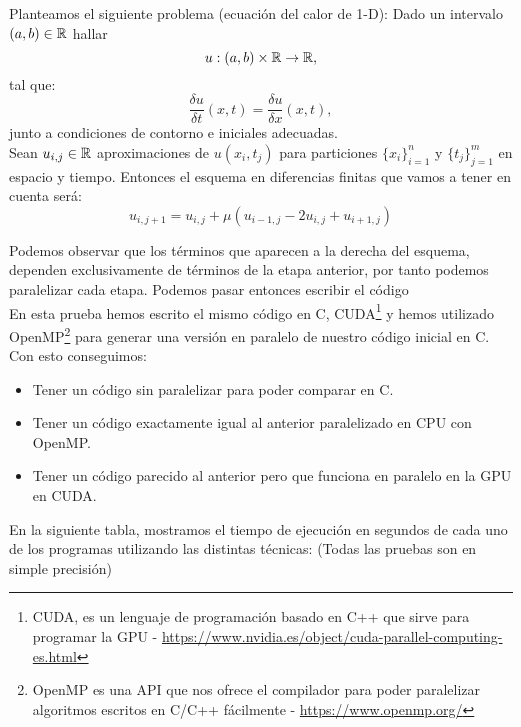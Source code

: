 \begin{ejemplo}
  Planteamos el siguiente problema (ecuación del calor de 1-D): 
  Dado un intervalo $(a, b) \in \mathbb R$ hallar $$u : (a, b) \times \mathbb R \rightarrow \mathbb R,$$ tal que:
  $$
	  \frac{\delta u}{\delta t} (x, t) = \frac{\delta u}{\delta x} (x, t),
  $$
  junto a condiciones de contorno e iniciales adecuadas. \\
  Sean $u_{i, j} \in \mathbb R$ aproximaciones de $u(x_i, t_j)$ para particiones $\{x_i\}^n_{i=1}$ y $\{t_j\}_{j=1}^m$ en espacio y tiempo. Entonces el esquema en diferencias finitas que vamos a tener en cuenta será:
  \[
  u_{i, j+1} = u_{i, j} + \mu (u_{i-1, j} - 2 u_{i, j} + u_{i+1, j})
  \]
  
  Podemos observar que los términos que aparecen a la derecha del esquema, dependen exclusivamente de términos de la etapa anterior, por tanto podemos paralelizar cada etapa. Podemos pasar entonces escribir el código\\
  
  En esta prueba hemos escrito el mismo código en C, CUDA\footnote{CUDA, es un lenguaje de programación basado en C++ que sirve para programar la GPU - \href{https://www.nvidia.es/object/cuda-parallel-computing-es.html}{https://www.nvidia.es/object/cuda-parallel-computing-es.html}} y hemos utilizado OpenMP\footnote{OpenMP es una API que nos ofrece el compilador para poder paralelizar algoritmos escritos en C/C++ fácilmente -  \href{https://www.openmp.org/}{https://www.openmp.org/}} para generar una versión en paralelo de nuestro código inicial en C. Con esto conseguimos:
  \begin{itemize}
  \item Tener un código sin paralelizar para poder comparar en C.
  \item Tener un código exactamente igual al anterior paralelizado en CPU con OpenMP.
  \item Tener un código parecido al anterior pero que funciona en paralelo en la GPU en CUDA.
  \end{itemize}

  En la siguiente tabla, mostramos el tiempo de ejecución en segundos de cada uno de los programas utilizando las distintas técnicas: (Todas las pruebas son en simple precisión)
  

\end{ejemplo}
